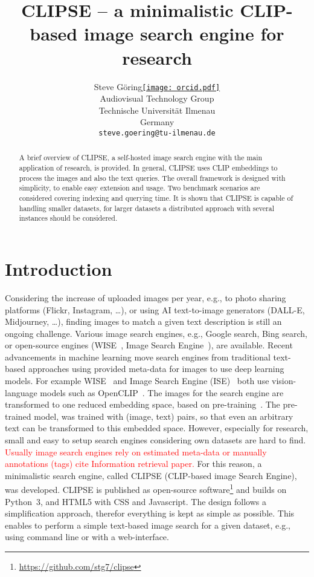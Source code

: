 \documentclass{article}
\title{CLIPSE -- a minimalistic CLIP-based image search engine for research}
\author{ Steve Göring\hspace{1mm}\href{https://orcid.org/0000-0001-6810-6969}{\texttt{[image: orcid.pdf]}}\\
    Audiovisual Technology Group\\
    Technische Universität Ilmenau\\
    Germany \\
    \texttt{steve.goering@tu-ilmenau.de} \\
}
\begin{document}
\maketitle

\begin{abstract}
A brief overview of CLIPSE, a self-hosted image search engine with the main application of research, is provided.
In general, CLIPSE uses CLIP embeddings to process the images and also the text queries.
The overall framework is designed with simplicity, to enable easy extension and usage.
Two benchmark scenarios are considered covering indexing and querying time.
It is shown that CLIPSE is capable of handling smaller datasets, for larger datasets a distributed approach with several instances should be considered.
\end{abstract}




\section{Introduction}
Considering the increase of uploaded images per year, e.g., to photo sharing platforms (Flickr, Instagram, \ldots), or using AI text-to-image generators (DALL-E, Midjourney, \ldots), finding images to match a given text description is still an ongoing challenge.
Various image search engines, e.g., Google search, Bing search, or open-source engines (WISE~\cite{wise}, Image Search Engine~\cite{ise}), are available.
Recent advancements in machine learning move search engines from traditional text-based approaches using provided meta-data for images to use deep learning models.
For example WISE~\cite{wise} and Image Search Engine (ISE)~\cite{ise} both use vision-language models such as OpenCLIP~\cite{ilharco_gabriel_2021_5143773,cherti2023reproducible,Radford2021LearningTV,schuhmann2022laionb}.
The images for the search engine are transformed to one reduced embedding space, based on pre-training~\cite{Radford2021LearningTV}.
The pre-trained model, was trained with (image, text) pairs, so that even an arbitrary text can be transformed to this embedded space.
However, especially for research, small and easy to setup search engines considering own datasets are hard to find.
\textcolor{red}{Usually image search engines rely on estimated meta-data or manually annotations (tags) cite Information retrieval paper.}
For this reason, a minimalistic search engine, called CLIPSE (CLIP-based image Search Engine), was developed.
CLIPSE is published as open-source software\footnote{\url{https://github.com/stg7/clipse}} and builds on Python~3, and HTML5 with CSS and Javascript.
The design follows a simplification approach, therefor everything is kept as simple as possible.
This enables to perform a simple text-based image search for a given dataset, e.g., using command line or with a web-interface.
\end{document}

